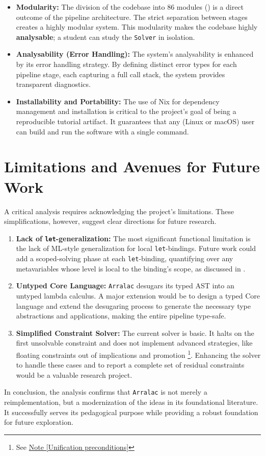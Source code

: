 \begin{itemize}
    \item \textbf{Modularity:} The division of the codebase into 86 modules () is a direct outcome of the pipeline architecture. The strict separation between stages creates a highly modular system. This modularity makes the codebase highly \textbf{analysable}; a student can study the \texttt{Solver} in isolation.
    \item \textbf{Analysability (Error Handling):} The system's analysability is enhanced by its error handling strategy. By defining distinct error types for each pipeline stage, each capturing a full call stack, the system provides transparent diagnostics.
    \item \textbf{Installability and Portability:} The use of Nix for dependency management and installation is critical to the project's goal of being a reproducible tutorial artifact. It guarantees that any (Linux or macOS) user can build and run the software with a single command.
\end{itemize}

\section{Limitations and Avenues for Future Work}
\label{sec:Discussion:Limitations}
A critical analysis requires acknowledging the project's limitations. These simplifications, however, suggest clear directions for future research.

\begin{enumerate}
    \item \textbf{Lack of \texttt{let}-generalization:} The most significant functional limitation is the lack of ML-style generalization for local \texttt{let}-bindings. Future work could add a scoped-solving phase at each \texttt{let}-binding, quantifying over any metavariables whose level is local to the binding's scope, as discussed in \cite{wits-type-inference-using-constraints}.

    \item \textbf{Untyped Core Language:} \texttt{Arralac} desugars its typed AST into an untyped lambda calculus. A major extension would be to design a typed Core language and extend the desugaring process to generate the necessary type abstractions and applications, making the entire pipeline type-safe.

    \item \textbf{Simplified Constraint Solver:} The current solver is basic. It halts on the first unsolvable constraint and does not implement advanced strategies, like floating constraints out of implications and promotion \footnote{See \href{https://github.com/ghc/ghc/blob/ed38c09bd89307a7d3f219e1965a0d9743d0ca73/compiler/GHC/Tc/Utils/Unify.hs\#L2589}{Note [Unification preconditions]}}. Enhancing the solver to handle these cases and to report a complete set of residual constraints would be a valuable research project.
\end{enumerate}

In conclusion, the analysis confirms that \texttt{Arralac} is not merely a \\ reimplementation, but a modernization of the ideas in its foundational literature. It successfully serves its pedagogical purpose while providing a robust foundation for future exploration.